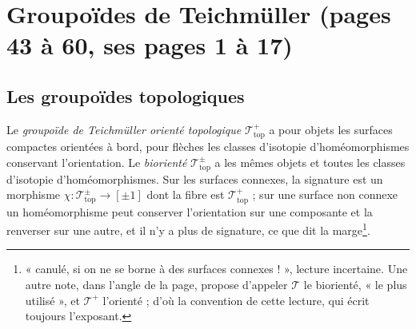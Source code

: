 \documentclass[11pt,a4paper]{article}
\begin{document}
\section*{Groupoïdes de Teichmüller (pages 43 à 60, ses pages 1 à 17)}

\subsection*{Les groupoïdes topologiques}

Le \emph{groupoïde de Teichmüller orienté topologique}
$\mathcal{T}^{+}_{\mathrm{top}}$ a pour objets les surfaces compactes orientées
à bord, pour flèches les classes d'isotopie d'homéomorphismes conservant
l'orientation. Le \emph{biorienté} $\mathcal{T}^{\pm}_{\mathrm{top}}$ a les
mêmes objets et toutes les classes d'isotopie d'homéomorphismes. Sur les
surfaces connexes, la signature est un morphisme $\chi :
\mathcal{T}^{\pm}_{\mathrm{top}} \to [\pm 1]$ dont la fibre est
$\mathcal{T}^{+}_{\mathrm{top}}$ ; sur une surface non connexe un homéomorphisme
peut conserver l'orientation sur une composante et la renverser sur une autre,
et il n'y a plus de signature, ce que dit la marge\footnote{« canulé, si on ne
se borne à des surfaces connexes ! », lecture incertaine. Une autre note, dans
l'angle de la page, propose d'appeler $\mathcal{T}$ le biorienté, « le plus
utilisé », et $\mathcal{T}^{+}$ l'orienté ; d'où la convention de cette lecture,
qui écrit toujours l'exposant.}.
\end{document}
